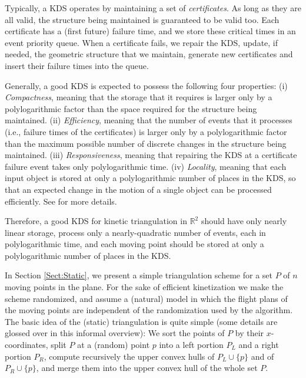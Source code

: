 \documentclass[11pt]{article}
\def\reals{{\mathbb R}}
\begin{document}
Typically, a KDS operates by maintaining a set of \textit{certificates}. As long as they are all valid, the structure being maintained is guaranteed to be valid too. Each certificate has a (first future) failure time, and we store these critical times in an event priority queue. When a certificate fails, we repair the KDS, update, if needed, the geometric structure that we maintain, generate new certificates and insert their failure times into the queue. 

Generally, a good KDS is expected to possess the following four properties: (i) \textit{Compactness}, meaning that the storage that it requires is larger only by a polylogarithmic factor than the space required for the structure being maintained. (ii) \textit{Efficiency}, meaning that the number of events that it processes (i.e., failure times of the certificates) is larger only by a polylogarithmic factor than the maximum possible number of discrete changes in the structure being maintained. (iii) \textit{Responsiveness}, meaning that repairing the KDS at a certificate failure event takes only  polylogarithmic time. (iv) \textit{Locality}, meaning that each input object is stored at only a polylogarithmic number of places in the KDS, so that an expected change in the motion of a single object can be processed efficiently. See \cite{AKS,BG99} for more details.


Therefore, a good KDS for 
kinetic triangulation in $\reals^2$ should have only nearly linear storage, process only a nearly-quadratic number of events, each in polylogarithmic time, and each moving point should be stored at only a polylogarithmic number of places in the KDS.


\medskip
{}
In Section \ref{Sect:Static}, we present a simple triangulation scheme for a set $P$ of $n$ moving
points in the plane. For the sake of efficient kinetization we make
the scheme randomized, and assume a (natural) model in which the flight plans of
the moving points are independent of the randomization used by the
algorithm. The basic idea of the (static) triangulation is quite
simple (some details are glossed over in this informal overview):
We sort the points of $P$ by their $x$-coordinates, split $P$ at a
(random) point $p$ into a left portion $P_L$ and a right portion
$P_R$, compute recursively the upper convex hulls of
$P_L\cup\{p\}$ and of $P_R\cup\{p\}$, and merge them into 
the upper convex hull of the whole set $P$.
\end{document}
